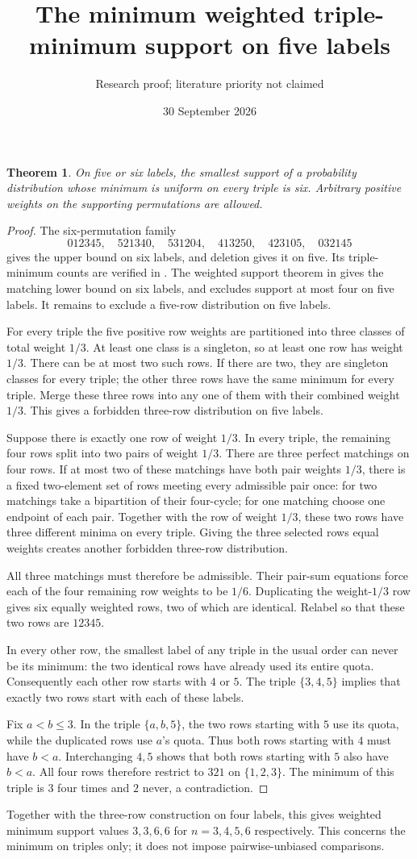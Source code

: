 \documentclass[11pt]{article}
\title{The minimum weighted triple-minimum support on five labels}
\author{Research proof; literature priority not claimed}
\date{30 September 2026}
\newtheorem{theorem}{Theorem}
\begin{document}
\maketitle
\begin{theorem}
On five or six labels, the smallest support of a probability distribution
whose minimum is uniform on every triple is six. Arbitrary positive
weights on the supporting permutations are allowed.
\end{theorem}
\begin{proof}
The six-permutation family
\[
012345,\quad521340,\quad531204,\quad413250,\quad423105,\quad032145
\]
gives the upper bound on six labels, and deletion gives it on five.
Its triple-minimum counts are verified in
.
The weighted support theorem in
 gives the matching lower
bound on six labels, and excludes support at most four on five labels.
It remains to exclude a five-row distribution on five labels.

For every triple the five positive row weights are partitioned into
three classes of total weight $1/3$. At least one class is a singleton,
so at least one row has weight $1/3$. There can be at most two such
rows. If there are two, they are singleton classes for every triple;
the other three rows have the same minimum for every triple. Merge
these three rows into any one of them with their combined weight
$1/3$. This gives a forbidden three-row distribution on five labels.

Suppose there is exactly one row of weight $1/3$. In every triple,
the remaining four rows split into two pairs of weight $1/3$.
There are three perfect matchings on four rows. If at most two of
these matchings have both pair weights $1/3$, there is a fixed
two-element set of rows meeting every admissible pair once: for two
matchings take a bipartition of their four-cycle; for one matching
choose one endpoint of each pair. Together with the row of weight
$1/3$, these two rows have three different minima on every triple.
Giving the three selected rows equal weights creates another
forbidden three-row distribution.

All three matchings must therefore be admissible. Their pair-sum
equations force each of the four remaining row weights to be $1/6$.
Duplicating the weight-$1/3$ row gives six equally weighted rows,
two of which are identical. Relabel so that these two rows are
$12345$.

In every other row, the smallest label of any triple in the usual
order can never be its minimum: the two identical rows have already
used its entire quota. Consequently each other row starts with $4$
or $5$. The triple $\{3,4,5\}$ implies that exactly two rows start
with each of these labels.

Fix $a<b\le3$. In the triple $\{a,b,5\}$, the two rows starting with
$5$ use its quota, while the duplicated rows use $a$'s quota.
Thus both rows starting with $4$ must have $b<a$. Interchanging
$4,5$ shows that both rows starting with $5$ also have $b<a$.
All four rows therefore restrict to $321$ on $\{1,2,3\}$. The
minimum of this triple is $3$ four times and $2$ never, a contradiction.
\end{proof}
Together with the three-row construction on four labels, this gives
weighted minimum support values $3,3,6,6$ for $n=3,4,5,6$ respectively.
This concerns the minimum on triples only; it does not impose
pairwise-unbiased comparisons.
\end{document}
